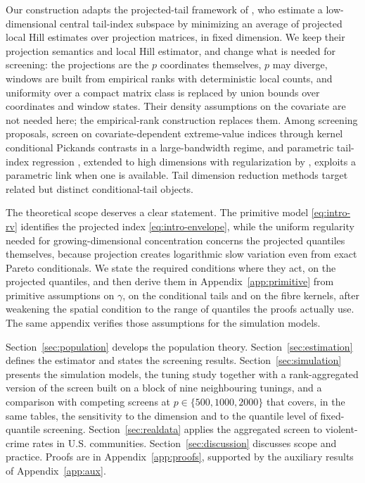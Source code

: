 \documentclass[bj,authoryear]{imsart}
\theoremstyle{plain}
\begin{document}
Our construction adapts the projected-tail framework of
\citet{gardesPodgorny2025}, who estimate a low-dimensional central tail-index
subspace by minimizing an average of projected local Hill estimates over
projection matrices, in fixed dimension. We keep their projection semantics
and local Hill estimator, and change what is needed for screening: the
projections are the $p$ coordinates themselves, $p$ may diverge, windows are
built from empirical ranks with deterministic local counts, and uniformity
over a compact matrix class is replaced by union bounds over coordinates and
window states. Their density assumptions on the covariate are not needed
here; the empirical-rank construction replaces them. Among screening
proposals, \citet{yoshidaUmezu2026} screen on covariate-dependent
extreme-value indices through kernel conditional Pickands contrasts in a
large-bandwidth regime, and parametric tail-index regression \citep{wangTsai2009}, extended to
high dimensions with regularization by \citet{sasakiTaoWang2026},
exploits a parametric link when one is available. Tail dimension reduction methods
\citep{gardes2018,aghbalouEtAl2024,bousebataEtAl2023,arbelEtAl2024} target
related but distinct conditional-tail objects.

The theoretical scope deserves a clear statement. The primitive model
\eqref{eq:intro-rv} identifies the projected index
\eqref{eq:intro-envelope}, while the uniform regularity needed for
growing-dimensional concentration concerns the projected quantiles
themselves, because projection creates logarithmic slow variation even
from exact Pareto conditionals. We state the required conditions where they
act, on the projected quantiles, and then derive them in
Appendix~\ref{app:primitive} from primitive assumptions on $\gamma$, on
the conditional tails and on the fibre kernels, after weakening the
spatial condition to the range of quantiles the proofs actually use. The
same appendix verifies those assumptions for the simulation models.

Section~\ref{sec:population} develops the population theory.
Section~\ref{sec:estimation} defines the estimator and states the screening
results. Section~\ref{sec:simulation} presents the simulation models, the tuning
study together with a rank-aggregated version of the screen built on a
block of nine neighbouring tunings, and a comparison with competing
screens at $p\in\{500,1000,2000\}$ that covers, in the same tables, the
sensitivity to the dimension and to the quantile level of fixed-quantile
screening. Section~\ref{sec:realdata} applies the aggregated screen to
violent-crime rates in U.S. communities.
Section~\ref{sec:discussion} discusses scope and practice. Proofs are in
Appendix~\ref{app:proofs}, supported by the auxiliary results of
Appendix~\ref{app:aux}.
\end{document}
